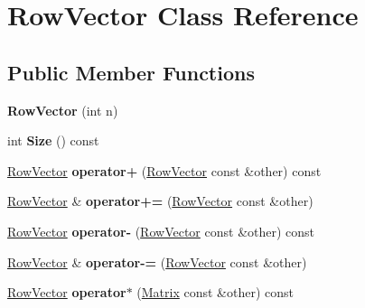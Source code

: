\hypertarget{classRowVector}{}\section{Row\+Vector Class Reference}
\label{classRowVector}
\subsection*{Public Member Functions}
\begin{DoxyCompactItemize}
\item 
\mbox{\label{classRowVector_a5996e3aced7d8763c45878e92d1f349f}} 
{\bfseries Row\+Vector} (int n)
\item 
\mbox{\label{classRowVector_a908702c4391bbc161aa6772f0d54c8ee}} 
int {\bfseries Size} () const
\item 
\mbox{\label{classRowVector_a5a89162620687e6996299b19f33787ea}} 
\hyperlink{classRowVector}{Row\+Vector} {\bfseries operator+} (\hyperlink{classRowVector}{Row\+Vector} const \&other) const
\item 
\mbox{\label{classRowVector_ad4c74075ad528067441aa5ac3e19aeb5}} 
\hyperlink{classRowVector}{Row\+Vector} \& {\bfseries operator+=} (\hyperlink{classRowVector}{Row\+Vector} const \&other)
\item 
\mbox{\label{classRowVector_ac3ba85bb1c677feb2eecb2f3a6605058}} 
\hyperlink{classRowVector}{Row\+Vector} {\bfseries operator-\/} (\hyperlink{classRowVector}{Row\+Vector} const \&other) const
\item 
\mbox{\label{classRowVector_a65e07309a4e65c892e1d7d6e08e0a274}} 
\hyperlink{classRowVector}{Row\+Vector} \& {\bfseries operator-\/=} (\hyperlink{classRowVector}{Row\+Vector} const \&other)
\item 
\mbox{\label{classRowVector_af672f25c9599e3646af0420c715c6632}} 
\hyperlink{classRowVector}{Row\+Vector} {\bfseries operator$\ast$} (\hyperlink{classMatrix}{Matrix} const \&other) const
\item 
\mbox{\label{classRowVector_abc8ca8934edb48f0ff4d74404b2fa0c8}} 

\end{DoxyCompactItemize}
